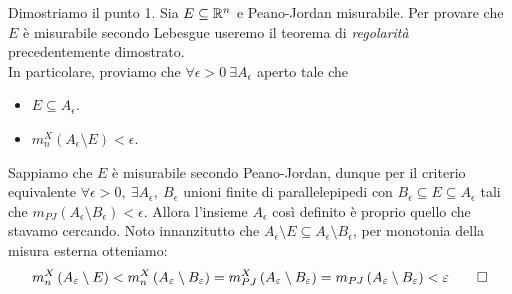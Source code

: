 \begin{demonstration}
	Dimostriamo il punto 1. Sia $E\subseteq \realset^n$ e Peano-Jordan misurabile. Per provare che $E$ è misurabile secondo Lebesgue useremo il teorema di \textit{regolarità} precedentemente dimostrato.\\
	In particolare, proviamo che $\forall \epsilon >0\ \exists A_{\epsilon}$ aperto tale che
	\begin{itemize}
		\item $E\subseteq A_{\epsilon}$.
		\item $m_n^{X}\left(A_{\epsilon}\setminus E\right)<\epsilon$.
	\end{itemize}
Sappiamo che $E$ è misurabile secondo Peano-Jordan, dunque per il criterio equivalente $\forall \epsilon >0,\ \exists A_{\epsilon},\ B_{\epsilon}$ unioni finite di parallelepipedi con $B_{\epsilon}\subseteq E\subseteq A_{\epsilon}$ tali che $m_{PJ}\left(A_{\epsilon}\setminus B_{\epsilon}\right)<\epsilon$. Allora l'insieme $A_{\epsilon}$ così definito è proprio quello che stavamo cercando. Noto innanzitutto che $A_{\epsilon}\setminus E\subseteq A_{\epsilon}\setminus B_{\epsilon}$, per monotonia della misura esterna otteniamo:
\begin{equation*}
	m_{n}^{X}\left(A_{\epsilon}\setminus E\right)<	m_{n}^{X}\left(A_{\epsilon}\setminus B_{\epsilon}\right)=m_{PJ}^X\left(A_{\epsilon}\setminus B_{\epsilon}\right)=m_{PJ}\left(A_{\epsilon}\setminus B_{\epsilon}\right)<\epsilon\qedhere
\end{equation*}
\end{demonstration}
